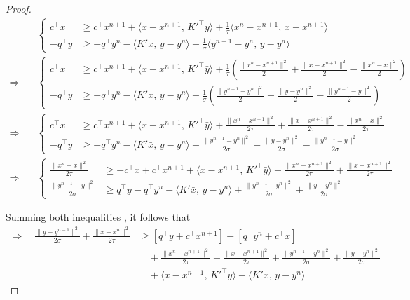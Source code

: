 \documentclass[twoside,12pt,openright]{report}  %
\begin{document}
\begin{proof}
\begin{align*}
&\left\{
\begin{aligned}
c^\top x &\geq c^\top x^{n+1} + \langle x - x^{n+1},\, K'^\top \bar{y} \rangle + \frac{1}{\tau} \langle x^n - x^{n+1},\, x - x^{n+1} \rangle \\
-q^\top y &\geq -q^\top y^{n} - \langle K' \bar{x},\, y - y^{n} \rangle + \frac{1}{\sigma} \langle y^{n-1} - y^{n},\, y - y^{n} \rangle
\end{aligned}
\right. \\[2ex]
%
\Rightarrow\quad
&\left\{
\begin{aligned}
c^\top x &\geq c^\top x^{n+1} + \langle x - x^{n+1},\, K'^\top \bar{y} \rangle 
+ \frac{1}{\tau} \left( \frac{\|x^n - x^{n+1}\|^2}{2} + \frac{\|x - x^{n+1}\|^2}{2} - \frac{\|x^n - x\|^2}{2} \right) \\
-q^\top y &\geq -q^\top y^{n} - \langle K' \bar{x},\, y - y^{n} \rangle 
+ \frac{1}{\sigma} \left( \frac{\|y^{n-1} - y^{n}\|^2}{2} + \frac{\|y - y^{n}\|^2}{2} - \frac{\|y^{n-1} - y\|^2}{2} \right)
\end{aligned}
\right. \\[2ex]
%
\Rightarrow\quad
&\left\{
\begin{aligned}
c^\top x &\geq c^\top x^{n+1} + \langle x - x^{n+1},\, K'^\top \bar{y} \rangle 
+ \frac{\|x^n - x^{n+1}\|^2}{2\tau} + \frac{\|x - x^{n+1}\|^2}{2\tau} - \frac{\|x^n - x\|^2}{2\tau} \\
-q^\top y &\geq -q^\top y^{n} - \langle K' \bar{x},\, y - y^{n} \rangle 
+ \frac{\|y^{n-1} - y^{n}\|^2}{2\sigma} + \frac{\|y - y^{n}\|^2}{2\sigma} - \frac{\|y^{n-1} - y\|^2}{2\sigma}
\end{aligned}
\right. \\[2ex]
%
\Rightarrow\quad
&\left\{
\begin{aligned}
\frac{\|x^n - x\|^2}{2\tau} &\geq -c^\top x + c^\top x^{n+1} + \langle x - x^{n+1},\, K'^\top \bar{y} \rangle 
+ \frac{\|x^n - x^{n+1}\|^2}{2\tau} + \frac{\|x - x^{n+1}\|^2}{2\tau} \\
\frac{\|y^{n-1} - y\|^2}{2\sigma} &\geq q^\top y - q^\top y^{n} - \langle K' \bar{x},\, y - y^{n} \rangle 
+ \frac{\|y^{n-1} - y^{n}\|^2}{2\sigma} + \frac{\|y - y^{n}\|^2}{2\sigma}
\end{aligned}
\right.
\end{align*}

    Summing both inequalities , it follows that 
\[
\begin{aligned}
\Rightarrow \quad
 \frac{\|y - y^{n-1}\|^2}{2\sigma} + \frac{\|x - x^n\|^2}{2\tau} &\geq [q^\top y + c^\top x^{n+1}] - [q^\top y^{n} + c^\top x] \\
& \quad + \frac{\|x^n - x^{n+1}\|^2}{2\tau} + \frac{\|x - x^{n+1}\|^2}{2\tau} + \frac{\|y^{n-1} - y^{n}\|^2}{2\sigma} + \frac{\|y - y^{n}\|^2}{2\sigma} \\
& \quad + \langle x - x^{n+1},\, K'^\top \bar{y} \rangle - \langle K' \bar{x},\, y - y^{n} \rangle
\end{aligned}
\]


\end{proof}
\end{document}
